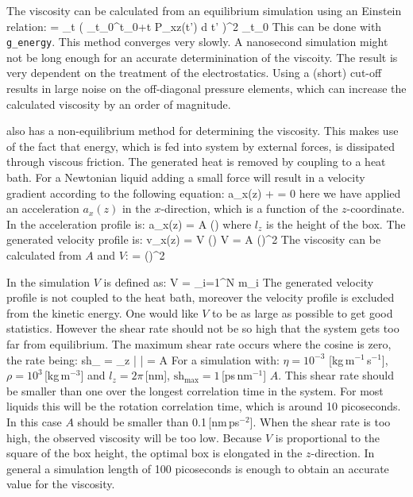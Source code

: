 The viscosity can be calculated from an equilibrium simulation using
an Einstein relation:
\beq
\eta =  \lim_{t \rightarrow \infty}
 \left\langle 
\left( \int_{t_0}^{{t_0}+t} P_{xz}(t') \mbox{d} t' \right)^2
\right\rangle_{t_0}
\eeq
This can be done with {\tt g\_energy}.
This method converges very slowly. A nanosecond simulation might not
be long enough for an accurate determinination of the viscoity.
The result is very dependent on the treatment of the electrostatics.
Using a (short) cut-off results in large noise on the off-diagonal
pressure elements, which can increase the calculated viscosity by an order
of magnitude.

{\gromacs} also has a non-equilibrium method for determining the viscosity.
This makes use of the fact that energy, which is fed into system by
external forces, is dissipated through viscous friction. The generated heat
is removed by coupling to a heat bath. For a Newtonian liquid adding a 
small force will result in a velocity gradient according to the following
equation:
\beq
a_x(z) + \frac{\eta}{\rho}  = 0
\eeq
here we have applied an acceleration $a_x(z)$ in the $x$-direction, which
is a function of the $z$-coordinate.
In {\gromacs} the acceleration profile is:
\beq
a_x(z) = A \cos\left(\right)
\eeq
where $l_z$ is the height of the box. The generated velocity profile is:
\beq
v_x(z) = V \cos\left(\right)
\eeq
\beq
V = A \frac{\rho}{\eta}\left(\right)^2
\eeq
The viscosity can be calculated from $A$ and $V$:
\beq
\label{visc}
\eta = \rho \left(\right)^2
\eeq

In the simulation $V$ is defined as:
\beq
V = 
         {\displaystyle \sum_{i=1}^N m_i}
\eeq
The generated velocity profile is not coupled to the heat bath, moreover
the velocity profile is excluded from the kinetic energy.
One would like $V$ to be as large as possible to get good statistics.
However the shear rate should not be so high that the system gets too far
from equilibrium. The maximum shear rate occurs where the cosine is zero,
the rate being:
\beq
\mbox{sh}_{\max} =  \max_z \left|  \right|
= A \frac{\rho}{\eta} 
\eeq
For a simulation with: $\eta=10^{-3}$ [kg\,m$^{-1}$\,s$^{-1}$],
$\rho=10^3$\,[kg\,m$^{-3}$] and $l_z=2\pi$\,[nm],
$\mbox{sh}_{\max}=1$\,[ps\,nm$^{-1}$] $A$.
This shear rate should be smaller than one over the longest
correlation time in the system. For most liquids this will be the rotation
correlation time, which is around 10 picoseconds. In this case $A$ should
be smaller than 0.1\,[nm\,ps$^{-2}$].
When the shear rate is too high, the observed viscosity will be too low.
Because $V$ is proportional to the square of the box height,
the optimal box is elongated in the $z$-direction.
In general a simulation length of 100 picoseconds is enough to obtain an
accurate value for the viscosity.

